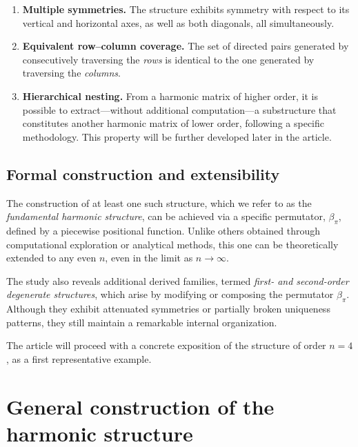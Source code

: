 \documentclass{article}
\begin{document}
\begin{enumerate}[label=\textbf{P\arabic*.}]
    \item \textbf{Multiple symmetries.} The structure exhibits symmetry with respect to its vertical and horizontal axes, as well as both diagonals, all simultaneously.

    \item \textbf{Equivalent row–column coverage.}  
    The set of directed pairs generated by consecutively traversing the \emph{rows} is identical to the one generated by traversing the \emph{columns}.

    \item \textbf{Hierarchical nesting.}  
    From a harmonic matrix of higher order, it is possible to extract—without additional computation—a substructure that constitutes another harmonic matrix of lower order, following a specific methodology. This property will be further developed later in the article.
\end{enumerate}

\subsection{Formal construction and extensibility}

The construction of at least one such structure, which we refer to as the \emph{fundamental harmonic structure}, can be achieved via a specific permutator, \(\beta_\pi\), defined by a piecewise positional function. Unlike others obtained through computational exploration or analytical methods, this one can be theoretically extended to any even \(n\), even in the limit as \(n \to \infty\).

The study also reveals additional derived families, termed \emph{first- and second-order degenerate structures}, which arise by modifying or composing the permutator \(\beta_\pi\). Although they exhibit attenuated symmetries or partially broken uniqueness patterns, they still maintain a remarkable internal organization.

\medskip

The article will proceed with a concrete exposition of the structure of order \(n = 4\), as a first representative example.



\section{General construction of the harmonic structure}
\label{sec:construccion}
\end{document}

